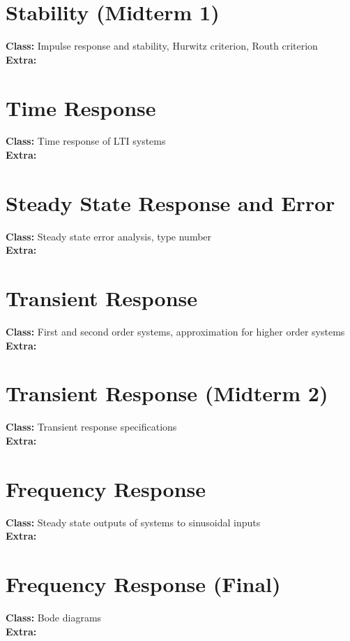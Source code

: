 \documentclass[margin]{scrartcl}
\begin{document}
\section{Stability (Midterm 1)}
\textbf{Class:} Impulse response and stability, Hurwitz criterion, Routh criterion \\
\textbf{Extra:} 

\section{Time Response}
\textbf{Class:} Time response of LTI systems \\
\textbf{Extra:} 

\section{Steady State Response and Error}
\textbf{Class:} Steady state error analysis, type number \\
\textbf{Extra:}

\section{Transient Response}
\textbf{Class:}  First and second order systems, approximation for higher order systems \\
\textbf{Extra:} 

\section{Transient Response (Midterm 2)} 
\textbf{Class:} Transient response specifications \\
\textbf{Extra:} 

\section{Frequency Response}
\textbf{Class:} Steady state outputs of systems to sinusoidal inputs \\
\textbf{Extra:} 

\section{Frequency Response (Final)}
\textbf{Class:} Bode diagrams \\
\textbf{Extra:} 
\end{document}
